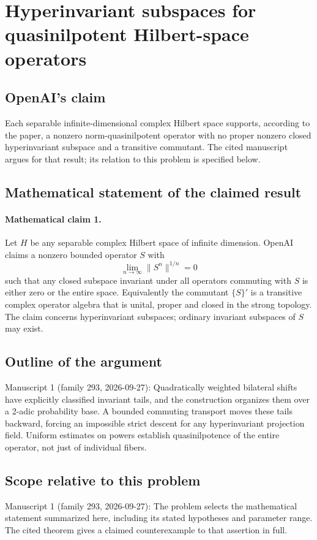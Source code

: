\documentclass[11pt]{article}
\begin{document}
\section*{Hyperinvariant subspaces for quasinilpotent Hilbert-space operators}

\subsection{OpenAI's claim}
Each separable infinite-dimensional complex Hilbert space supports, according to the paper, a nonzero norm-quasinilpotent operator with no proper nonzero closed hyperinvariant subspace and a transitive commutant. The cited manuscript argues for that result; its relation to this problem is specified below.

\subsection{Mathematical statement of the claimed result}
\paragraph{Mathematical claim 1.} Let $H$ be any separable complex Hilbert space of infinite dimension. OpenAI claims a nonzero bounded operator $S$ with
\[
\lim_{n\to\infty}\|S^n\|^{1/n}=0
\]
such that any closed subspace invariant under all operators commuting with $S$ is either zero or the entire space. Equivalently the commutant $\{S\}'$ is a transitive complex operator algebra that is unital, proper and closed in the strong topology. The claim concerns hyperinvariant subspaces; ordinary invariant subspaces of $S$ may exist.

\subsection{Outline of the argument}
Manuscript 1 (family 293, 2026-09-27): Quadratically weighted bilateral shifts have explicitly classified invariant tails, and the construction organizes them over a 2-adic probability base. A bounded commuting transport moves these tails backward, forcing an impossible strict descent for any hyperinvariant projection field. Uniform estimates on powers establish quasinilpotence of the entire operator, not just of individual fibers.

\subsection{Scope relative to this problem}
Manuscript 1 (family 293, 2026-09-27): The problem selects the mathematical statement summarized here, including its stated hypotheses and parameter range. The cited theorem gives a claimed counterexample to that assertion in full.
\end{document}
